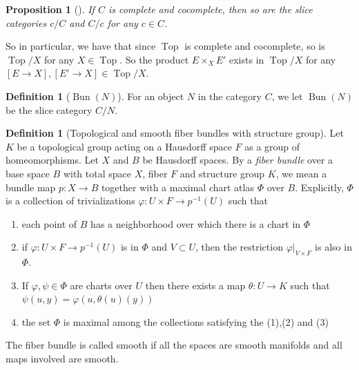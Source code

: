 \documentclass[reqno]{amsart}
\newtheorem{proposition}[theorem]{Proposition}
\theoremstyle{definition}
\newtheorem{definition}[theorem]{Definition}
\theoremstyle{remark}
\DeclareMathOperator{\Top}{Top}
\DeclareMathOperator{\Bun}{Bun}
\begin{document}
    \begin{proposition}[\cite{Riehl}]
        If $C$ is complete and cocomplete, then so
        are the slice categories
        $c / C$ and $C / c$ for any $c \in C$.
    \end{proposition}

    So in particular, we have that since
    $\Top$ is complete and cocomplete, so
    is $\Top /X$ for any $X \in \Top$.
    So the product
    $E \times_X E'$ exists in $\Top / X$ for any
    $\left[ E \to X \right] ,
    \left[ E' \to X \right] \in \Top /X$.


    \begin{definition}[$\Bun(N)$]
        For an object $N$ in the category
        $C$, we let
        $\Bun(N)$ be the slice category
        $C / N$.
    \end{definition}



    \begin{definition}[Topological and
        smooth fiber bundles with structure group]
    Let $K$ be a topological group acting on a
    Hausdorff space $F$ as a group of homeomorphisms.
    Let $X$ and $B$ be Hausdorff spaces. By a
    \textit{fiber bundle} over a base space
    $B$ with total space $X$, fiber $F$ and structure
    group $K$, we mean a bundle map
    $p \colon X \to B$ together with a maximal
    chart atlas
    $\Phi$ over $B$. Explicitly, $\Phi$ is a collection
    of trivializations
    $\varphi  \colon U
    \times F \to p^{-1}(U)$ such that
    \begin{enumerate}
        \item each point of $B$ has a neighborhood
            over which there is a chart in
            $\Phi$
        \item if $ \varphi \colon U \times F
            \to p^{-1} (U) $ is in
            $\Phi$ and  $V \subset U$, then the
            restriction
            $\varphi |_{V \times F}$ is also in
            $\Phi$.
        \item If $\varphi , \psi  \in \Phi$ are
            charts over $U$ then there exists a map
            $\theta \colon U \to K$ such that
            $\psi \left( u, y \right)
            = \varphi \left( u, \theta(u) (y) \right) $
        \item the set $\Phi$ is maximal among the collections
            satisfying the (1),(2) and (3)
    \end{enumerate}
    The fiber bundle is called smooth if all the spaces
    are smooth manifolds and all maps involved are smooth.
\end{definition}
\end{document}
